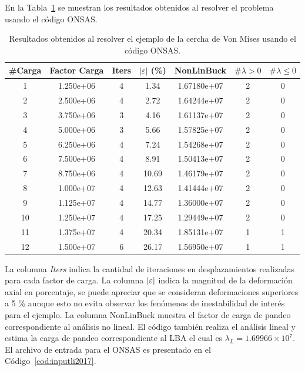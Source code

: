 En la Tabla~\ref{tab:resnsali} se muestran los resultados obtenidos al resolver el problema usando el código ONSAS. %
%
\begin{table}[htb]
	\centering
	\begin{tabular}{ccccccc}
		\hline
		\#Carga & Factor Carga & Iters & $|\varepsilon|$ (\%) & NonLinBuck  & $\# \lambda>0$ & $\# \lambda\leq0$ \\ 
		\hline
		1 &    1.250e+06  &    4  &  1.34 &  1.67180e+07 &     2 &   0 \\
		2 &    2.500e+06  &    4  &  2.72 &  1.64244e+07 &     2 &   0 \\
		3 &    3.750e+06  &    3  &  4.16 &  1.61137e+07 &     2 &   0 \\
		4 &    5.000e+06  &    3  &  5.66 &  1.57825e+07 &     2 &   0 \\
		5 &    6.250e+06  &    4  &  7.24 &  1.54268e+07 &     2 &   0 \\
		6 &    7.500e+06  &    4  &  8.91 &  1.50413e+07 &     2 &   0 \\
		7 &    8.750e+06  &    4  & 10.69 &  1.46179e+07 &     2 &   0 \\
		8 &    1.000e+07  &    4  & 12.63 &  1.41444e+07 &     2 &   0 \\
		9 &    1.125e+07  &    4  & 14.77 &  1.36000e+07 &     2 &   0 \\
		10 &    1.250e+07  &    4  & 17.25 &  1.29449e+07 &     2 &   0 \\
		11 &    1.375e+07  &    4  & 20.34 &  1.85131e+07 &     1 &   1 \\
		12 &    1.500e+07  &    6  & 26.17 &  1.56950e+07 &     1 &   1 \\
		\hline
	\end{tabular}
	\caption{Resultados obtenidos al resolver el ejemplo de la cercha de Von Mises usando el código ONSAS.}
	\label{tab:resnsali}
\end{table}
%
La columna \textit{Iters} indica la cantidad de iteraciones en desplazamientos realizadas para cada factor de carga. La columna $|\varepsilon|$ indica la  magnitud de la deformación axial en porcentaje, se puede apreciar que se consideran deformaciones superiores a 5 \% aunque esto no evita observar los fenómenos de inestabilidad de interés para el ejemplo. %
%
La columna NonLinBuck muestra el factor de carga de pandeo correspondiente al análisis no lineal. %
%
El código también realiza el análisis lineal y estima la carga de pandeo correspondiente al LBA el cual es $\lambda_L = 1.69966 \times 10^7$. %
%
El archivo de entrada para el ONSAS es presentado en el Código~\ref{cod:inputli2017}.

